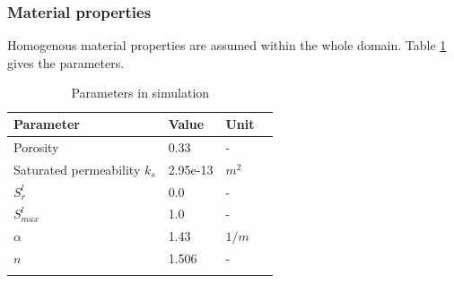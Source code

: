 \subsubsection*{Material properties}
Homogenous material properties are assumed within the whole
domain. Table \ref{us:forsythsetting} gives the parameters.
\begin{table}[H]
 \centering
 \caption{Parameters in simulation} \centering \label{us:forsythsetting}
 \begin{tabular}{llll}
 \hline\hline\noalign{\smallskip}
 Parameter    & Value  &  Unit  \\ \hline
 Porosity          & 0.33   & -   \\
 Saturated permeability $k_s$ &2.95e-13 & $m^2$ \\
 $S_r^l$           & 0.0    &  - \\
 $S_{max}^l$        & 1.0    &  - \\
 $\alpha$           & 1.43   &  $1/m$ \\
 $n$                & 1.506  &  - \\
\noalign{\smallskip}\hline\hline
 \end{tabular}
\end{table}
%
